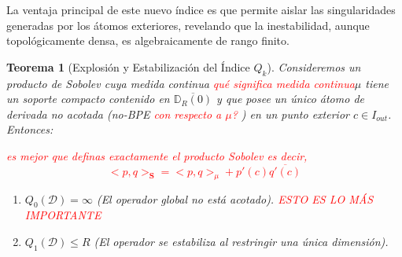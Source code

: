 \documentclass[12pt,a4paper]{article}
\newtheorem{theorem}{Teorema}
\theoremstyle{definition}
\theoremstyle{remark}
\begin{document}
La ventaja principal de este nuevo índice es que permite aislar las singularidades generadas por los átomos exteriores, revelando que la inestabilidad, aunque topológicamente densa, es algebraicamente de rango finito.

\begin{theorem}[Explosión y Estabilización del Índice $Q_k$]\label{thm:Qk_no_BPE}
	Consideremos un producto de Sobolev cuya medida continua \textcolor{red}{qué significa medida continua}$\mu$ tiene un soporte compacto contenido en $\overline{\mathbb{D}_R(0)}$ y que posee un único átomo de derivada no acotada (no-BPE \textcolor{red}{ con respecto a $\mu$? }) en un punto exterior $c \in I_{out}$. Entonces:

    \textcolor{red}{es mejor que definas exactamente el producto Sobolev es decir, 
    $$
    <p,q>_{\mathbf{S}}= <p,q>_{\mu} + p'(c)\overline{q'(c)}
    $$   
    }
	\begin{enumerate}
		\item $Q_0(\mathcal{D}) = \infty$ (El operador global no está acotado). \textcolor{red}{ESTO ES LO MÁS IMPORTANTE  }
		\item $Q_1(\mathcal{D}) \le R$ (El operador se estabiliza al restringir una única dimensión).
	\end{enumerate}
\end{theorem}
\end{document}
